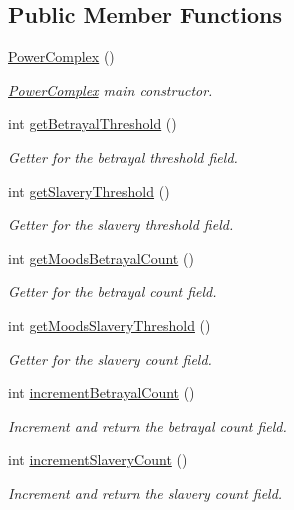 \subsection*{Public Member Functions}
\begin{DoxyCompactItemize}
\item 
\hyperlink{a00020_af124b7fecd7a7d29672520757ddd8169}{Power\-Complex} ()
\begin{DoxyCompactList}\small\item\em \hyperlink{a00020}{Power\-Complex} main constructor. \end{DoxyCompactList}\item 
int \hyperlink{a00015_a766902de5008b4ff54729075fe0b66a6}{get\-Betrayal\-Threshold} ()
\begin{DoxyCompactList}\small\item\em Getter for the betrayal threshold field. \end{DoxyCompactList}\item 
int \hyperlink{a00015_a8c5dda351cf131a2e2a30a1570e2c7e7}{get\-Slavery\-Threshold} ()
\begin{DoxyCompactList}\small\item\em Getter for the slavery threshold field. \end{DoxyCompactList}\item 
int \hyperlink{a00015_aae8ae123bc9d3bae48e08ad15528aa5b}{get\-Moods\-Betrayal\-Count} ()
\begin{DoxyCompactList}\small\item\em Getter for the betrayal count field. \end{DoxyCompactList}\item 
int \hyperlink{a00015_a859eb2f9bae00ce3604d0fea5a690900}{get\-Moods\-Slavery\-Threshold} ()
\begin{DoxyCompactList}\small\item\em Getter for the slavery count field. \end{DoxyCompactList}\item 
int \hyperlink{a00015_a322adb08d4a6f7dcd0eb00c77649d2d2}{increment\-Betrayal\-Count} ()
\begin{DoxyCompactList}\small\item\em Increment and return the betrayal count field. \end{DoxyCompactList}\item 
int \hyperlink{a00015_ac416312a82ad5afce4090858b47b0c96}{increment\-Slavery\-Count} ()
\begin{DoxyCompactList}\small\item\em Increment and return the slavery count field. \end{DoxyCompactList}\item 

\end{DoxyCompactItemize}
